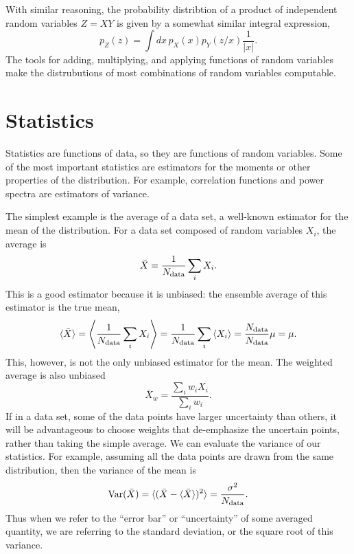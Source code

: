 With similar reasoning, the probability distribtion of a product of independent random variables $Z=XY$ is given by a somewhat similar integral expression,
\begin{equation}
   p_Z(z) =  \int dx\, p_X(x)  p_Y(z/x) \frac{1}{|x|}.
\end{equation}
The tools for adding, multiplying, and applying functions of random variables make the distrubutions of most combinations of random variables computable.

\section{Statistics}
Statistics are functions of data, so they are functions of random variables.  Some of the most important statistics are estimators for the moments or other properties of the distribution.  For example, correlation functions and power spectra are estimators of variance.

The simplest example is the average of a data set, a well-known estimator for the mean of the distribution.  For a data set composed of random variables $X_i$, the average is
\begin{equation}
  \bar X = \frac{1}{N_{\rm data}} \sum_i X_i.
\end{equation}
This is a good estimator because it is unbiased: the ensemble average of this estimator is the true mean,
\begin{equation}
  \langle \bar X \rangle = \left\langle \frac{1}{N_{\rm data}} \sum_i X_i \right\rangle =  \frac{1}{N_{\rm data}} \sum_i \left\langle X_i \right\rangle = \frac{N_{\rm data}}{N_{\rm data}} \mu = \mu.
\end{equation}
This, however, is not the only unbiased estimator for the mean.  The weighted average is also unbiased
\begin{equation}
  \bar { X}_w = \frac{ \sum_i w_i X_i}{\sum_i w_i}.
\end{equation}
If in a data set, some of the data points have larger uncertainty than others, it will be advantageous to choose weights that de-emphasize the uncertain points, rather than taking the simple average.  We can evaluate the variance of our statistics.  For example, assuming all the data points are drawn from the same distribution, then the variance of the mean is
\begin{equation}
 {\rm Var}(\bar X) =  \langle (\bar X - \langle \bar X \rangle)^2 \rangle = \frac{\sigma^2}{N_{\rm data}}.
\end{equation}
Thus when we refer to the ``error bar'' or ``uncertainty'' of some averaged quantity, we are referring to the standard deviation, or the square root of this variance.

